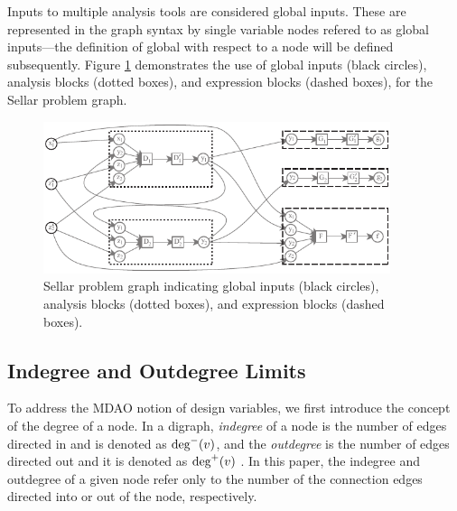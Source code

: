 Inputs to multiple analysis tools are considered global inputs. These are represented in the graph syntax by single variable nodes refered to as global inputs---the definition of global with respect to a node will be defined subsequently.
Figure \ref{f:obj-cons} demonstrates the use of global inputs (black circles), analysis blocks (dotted boxes), and expression blocks (dashed boxes), for the Sellar problem graph.
\begin{figure}[htb!]
  \begin{center}
    \includegraphics[width=4.0in]{images/sellar_obj_and_cons}
  \end{center}
  \caption{Sellar problem graph indicating global inputs (black circles), analysis blocks (dotted boxes), and expression blocks (dashed boxes).}
\label{f:obj-cons}
\end{figure} 

\subsection{Indegree and Outdegree Limits}
  \label{s:indegree-outdegree}
	To address the MDAO notion of design variables, we first introduce the concept of the degree of a node.
  In a digraph, \emph{indegree} of a node is the number of edges directed in and 
  is denoted as $\textrm{deg}^-(v)$, and the \emph{outdegree} 
  is the number of edges directed out and it is denoted as $\textrm{deg}^+(v)$ \cite{Diestel2010}.
  In this paper, the indegree and outdegree of a given node refer only to the number of the connection edges 
  directed into or out of the node, respectively. 

